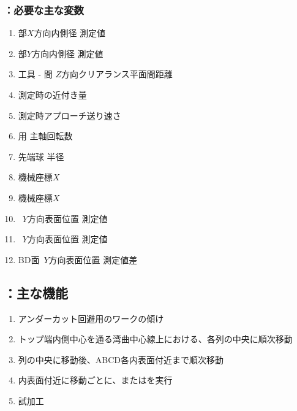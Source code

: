 \subsubsection{\DLone：必要な主な変数}
\begin{enumerate}[label*=\sarrow]
\item \TopEndFace 部$X$方向内側径 測定値
\item \TopEndFace 部$Y$方向内側径 測定値
\item 工具 - \EndFace 間 $Z$方向クリアランス平面間距離
\item \TouchSensorProbe 測定時の近付き量
\item \TouchSensorProbe 測定時アプローチ送り速さ
\item \DimpleMilling 用 主軸回転数
\item \TouchSensorProbe 先端球 半径
\item \NoOnePalette{} \JigCenter 機械座標$X$
\item \NoTwoPalette{} \JigCenter 機械座標$X$
\item \BfaceDimple~$Y$方向表面位置 測定値
\item \DfaceDimple~$Y$方向表面位置 測定値
\item BD面\Dimple~$Y$方向表面位置 測定値差
\end{enumerate}


\subsection{\DLone：主な機能}
\begin{enumerate}[label*=\sarrow]
\item アンダーカット回避用のワークの傾け
\item トップ端内側中心を通る湾曲中心線上における、\Dimple 各列の中央に順次移動
\item \Dimple 列の中央に移動後、ABCD各内表面付近まで順次移動
\item 内表面付近に移動ごとに、\DLtwoAC または\DLtwoBD を実行
\item \Dimple 試加工
\end{enumerate}


